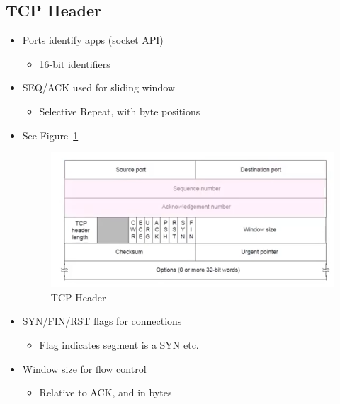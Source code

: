 \documentclass[12pt]{ctexart}   %
\begin{document}
	\subsection{TCP Header }
	\begin{itemize}
		\item Ports identify apps (socket API)
		\begin{itemize}
			\item 16-bit identifiers
		\end{itemize}
		
		\item SEQ/ACK used for sliding window
		\begin{itemize}
			\item Selective Repeat, with byte positions
		\end{itemize}
		\item See Figure~\ref{fig:6-8-3}
		  
		 \begin{figure}[h!] %
		\centering
		 \includegraphics[scale=0.7]{images/6-8-3}
		\caption{ TCP Header }
		 \label{fig:6-8-3}
		 \end{figure}
		 
		 \item SYN/FIN/RST flags for connections
		 \begin{itemize}
		 	\item Flag indicates segment is a SYN etc.
		 \end{itemize}
		 
		 \item Window size for flow control
		 \begin{itemize}
		 	\item Relative to ACK, and in bytes
		 \end{itemize}
		
	\end{itemize}
	
\end{document}
